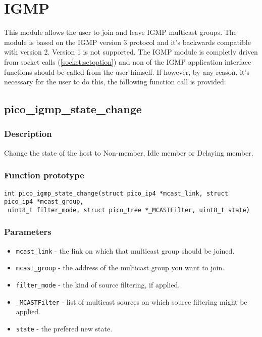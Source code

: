 \section{IGMP}

This module allows the user to join and leave IGMP multicast groups. The module is based on the IGMP version 3 protocol and it's backwards compatible with version 2. Version 1 is not supported. 
The IGMP module is completly driven from socket calls (\ref{socket:setoption}) and non of the IGMP application interface functions should be called from the user himself. If however, by any reason, it's necessary for the user to do this, the following function call is provided:

\subsection{pico\_igmp\_state\_change}

\subsubsection*{Description}
Change the state of the host to Non-member, Idle member or Delaying member.

\subsubsection*{Function prototype}
\begin{verbatim}
int pico_igmp_state_change(struct pico_ip4 *mcast_link, struct pico_ip4 *mcast_group,
 uint8_t filter_mode, struct pico_tree *_MCASTFilter, uint8_t state)
\end{verbatim}

\subsubsection*{Parameters}
\begin{itemize}[noitemsep]
\item \texttt{mcast\_link} - the link on which that multicast group should be joined.
\item \texttt{mcast\_group} - the address of the multicast group you want to join.
\item \texttt{filter\_mode} - the kind of source filtering, if applied.
\item \texttt{\_MCASTFilter} - list of multicast sources on which source filtering might be applied. 
\item \texttt{state} - the prefered new state.
\end{itemize}

